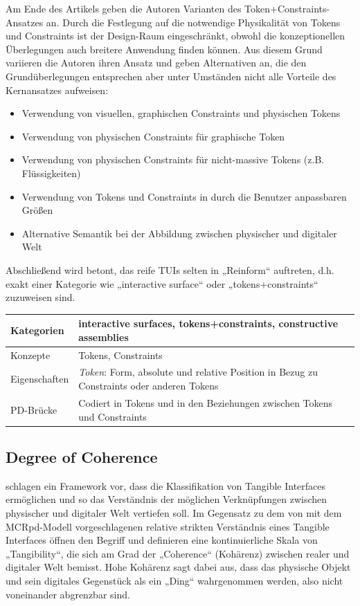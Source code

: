 Am Ende des Artikels geben die Autoren Varianten des Token+Constraints-Ansatzes an. Durch die Festlegung auf die notwendige Physikalität von Tokens und Constraints ist der Design-Raum eingeschränkt, obwohl die konzeptionellen Überlegungen auch breitere Anwendung finden können. Aus diesem Grund variieren die Autoren ihren Ansatz und geben Alternativen an, die den Grundüberlegungen entsprechen aber unter Umständen nicht alle Vorteile des Kernansatzes aufweisen:
\begin{itemize}
	\item Verwendung von visuellen, graphischen Constraints und physischen Tokens
	\item Verwendung von physischen Constraints für graphische Token
	\item Verwendung von physischen Constraints für nicht-massive Tokens (z.B. Flüssigkeiten)
	\item Verwendung von Tokens und Constraints in durch die Benutzer anpassbaren Größen
	\item Alternative Semantik bei der Abbildung zwischen physischer und digitaler Welt
\end{itemize}

Abschließend wird betont, das reife \glspl{TUI} selten in „Reinform“ auftreten, d.h. exakt einer Kategorie wie „interactive surface“ oder „tokens+constraints“ zuzuweisen sind. 

\begin{tabular}{| p{3cm} | p{10cm} |}
  \hline
  Kategorien & interactive surfaces, tokens+constraints, constructive assemblies \\ \hline
  Konzepte & Tokens, Constraints \\ \hline
  Eigenschaften & \emph{Token}: Form, absolute und relative Position in Bezug zu Constraints oder anderen Tokens \\ \hline
  PD-Brücke & Codiert in Tokens und in den Beziehungen zwischen Tokens und Constraints \\ \hline
\end{tabular} 


\subsection{Degree of Coherence} %
\label{sub:degree_of_coherence}
\citet{Koleva03} schlagen ein Framework vor, dass die Klassifikation von Tangible Interfaces ermöglichen und so das Verständnis der möglichen Verknüpfungen zwischen physischer und digitaler Welt vertiefen soll. Im Gegensatz zu dem von \citet{Ullmer00} mit dem MCRpd-Modell vorgeschlagenen relative strikten Verständnis eines Tangible Interfaces öffnen \citeauthor{Koleva03} den Begriff und definieren eine kontinuierliche Skala von „Tangibility“, die sich am Grad der „Coherence“ (Kohärenz) zwischen realer und digitaler Welt bemisst. Hohe Kohärenz sagt dabei aus, dass das physische Objekt und sein digitales Gegenstück als ein „Ding“ wahrgenommen werden, also nicht voneinander abgrenzbar sind.

